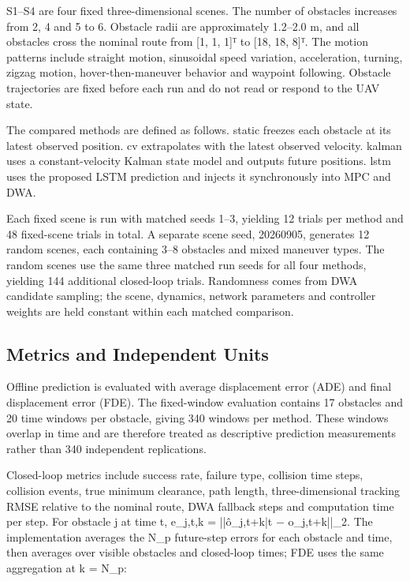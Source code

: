 \documentclass[10pt,a4paper]{article}
\begin{document}
S1–S4 are four fixed three-dimensional scenes. The number of obstacles increases from 2, 4 and 5 to 6. Obstacle radii are approximately 1.2–2.0 m, and all obstacles cross the nominal route from [1, 1, 1]ᵀ to [18, 18, 8]ᵀ. The motion patterns include straight motion, sinusoidal speed variation, acceleration, turning, zigzag motion, hover-then-maneuver behavior and waypoint following. Obstacle trajectories are fixed before each run and do not read or respond to the UAV state.

The compared methods are defined as follows. static freezes each obstacle at its latest observed position. cv extrapolates with the latest observed velocity. kalman uses a constant-velocity Kalman state model and outputs future positions. lstm uses the proposed LSTM prediction and injects it synchronously into MPC and DWA.

Each fixed scene is run with matched seeds 1–3, yielding 12 trials per method and 48 fixed-scene trials in total. A separate scene seed, 20260905, generates 12 random scenes, each containing 3–8 obstacles and mixed maneuver types. The random scenes use the same three matched run seeds for all four methods, yielding 144 additional closed-loop trials. Randomness comes from DWA candidate sampling; the scene, dynamics, network parameters and controller weights are held constant within each matched comparison.

\subsection{Metrics and Independent Units}

Offline prediction is evaluated with average displacement error (ADE) and final displacement error (FDE). The fixed-window evaluation contains 17 obstacles and 20 time windows per obstacle, giving 340 windows per method. These windows overlap in time and are therefore treated as descriptive prediction measurements rather than 340 independent replications.

Closed-loop metrics include success rate, failure type, collision time steps, collision events, true minimum clearance, path length, three-dimensional tracking RMSE relative to the nominal route, DWA fallback steps and computation time per step. For obstacle j at time t, e\_j,t,k = ||ô\_j,t+k|t − o\_j,t+k||\_2. The implementation averages the N\_p future-step errors for each obstacle and time, then averages over visible obstacles and closed-loop times; FDE uses the same aggregation at k = N\_p:
\end{document}
